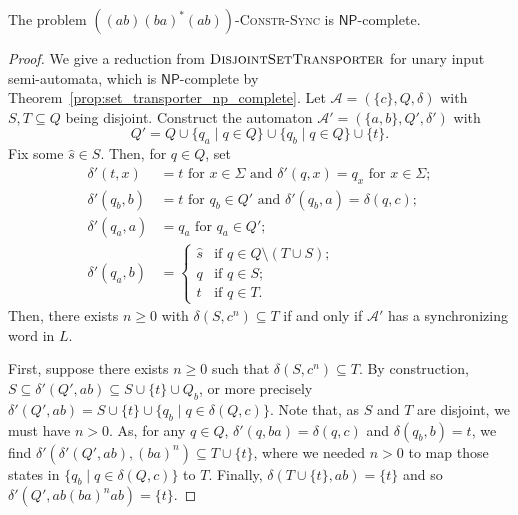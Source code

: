 \documentclass[runningheads,envcountsame]{llncs}
\theoremstyle{plain}
\theoremstyle{definition}
\newcommand{\NP}{\textsf{NP}}
\begin{document}
 \begin{propositionrep}\label{prop:np_complete_case}
  The problem $((ab)(ba)^*(ab))$\textsc{-Constr-Sync} is $\NP$-complete.
 \end{propositionrep}
 \begin{proof}
 We give a reduction from $\textsc{DisjointSetTransporter}$
 for unary input semi-automata, which is $\NP$-complete
 by Theorem~\ref{prop:set_transporter_np_complete}.
 Let $\mathcal A = (\{c\}, Q, \delta)$
 with $S, T \subseteq Q$ being disjoint.
 Construct the automaton $\mathcal A' = (\{a,b\}, Q', \delta')$
 with
 \[
  Q' = Q \cup \{ q_a \mid q \in Q \} \cup \{ q_b \mid q \in Q \} \cup \{ t \}. 
 \]
 Fix some $\hat s \in S$.
 Then, for $q \in Q$, set
\begin{align*}
    \delta'(t,   x) & = t \mbox{ for } x \in \Sigma \mbox{ and }
    \delta'(q,   x) = q_x \mbox{ for } x \in \Sigma; \\
    \delta'(q_b, b) & = t   \mbox{ for } q_b \in Q'  \mbox{ and } 
    \delta'(q_b, a) = \delta(q, c); \\
    \delta'(q_a, a) & = q_a \mbox{ for } q_a \in Q'; \\
    \delta'(q_a, b) & = \left\{ 
    \begin{array}{ll}
     \hat s & \mbox{if } q \in Q \setminus (T \cup S); \\
     q      & \mbox{if } q \in S; \\
     t      & \mbox{if } q \in T.
    \end{array}
    \right.
\end{align*}
 Then, there exists $n \ge 0$
 with $\delta(S, c^n) \subseteq T$
 if and only if $\mathcal A'$ has a synchronizing word in $L$.
 
 First, suppose there exists $n \ge 0$
 such that $\delta(S, c^n) \subseteq T$.
 By construction, $S \subseteq \delta'(Q', ab) \subseteq S \cup \{t\} \cup Q_b$,
 or more precisely $\delta'(Q', ab) = S \cup \{t\} \cup \{ q_b \mid q \in \delta(Q, c) \}$.
 Note that, as $S$ and $T$ are disjoint,
 we must have $n > 0$.
 As, for any $q \in Q$, $\delta'(q, ba) = \delta(q, c)$
 and $\delta(q_b, b) = t$,
 we find $\delta'(\delta'(Q', ab), (ba)^n) \subseteq T \cup \{t\}$,
 where we needed $n > 0$ to map those states in $\{ q_b \mid q \in \delta(Q, c) \}$
 to $T$.
 Finally, $\delta(T \cup \{t\}, ab) = \{t\}$
 and so $\delta'(Q', ab(ba)^nab) = \{t\}$.
 

\end{proof}
\end{document}
